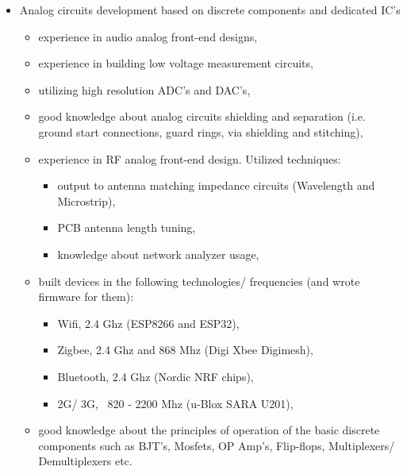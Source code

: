 \documentclass{tccv}
\begin{document}
\begin{itemize}
     \item Analog circuits development based on discrete components and dedicated IC's
     \begin{itemize}
          \item experience in audio analog front-end designs,
          \item experience in building low voltage measurement circuits,
          \item utilizing high resolution ADC's and DAC's,
          \item good knowledge about analog circuits shielding and separation (i.e. ground start connections, guard rings, via shielding and stitching),
          \item experience in RF analog front-end design. Utilized techniques: 
          \begin{itemize}
               \item output to antenna matching impedance circuits (Wavelength and Microstrip),
               \item PCB antenna length tuning,
               \item knowledge about network analyzer usage,
          \end{itemize}        
          \item built devices in the following technologies/ frequencies (and wrote firmware for them):
          \begin{itemize}
               \item Wifi, 2.4 Ghz (ESP8266 and ESP32),
               \item Zigbee, 2.4 Ghz and 868 Mhz (Digi Xbee Digimesh),
               \item Bluetooth, 2.4 Ghz (Nordic NRF chips),
               \item 2G/ 3G, ~820 - 2200 Mhz (u-Blox SARA U201), 
          \end{itemize}
          \item good knowledge about the principles of operation of the basic discrete components such as BJT's, Mosfets, OP Amp's, Flip-flops, Multiplexers/ Demultiplexers etc.
     \end{itemize}
\end{itemize}
\end{document}
